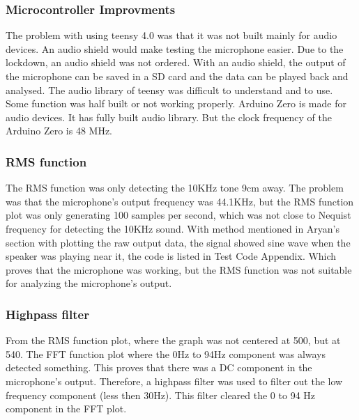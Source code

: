 \subsubsection{Microcontroller Improvments}
The problem with using teensy 4.0 was that it was not built mainly for audio devices. An audio shield would make testing the microphone easier. Due to the lockdown, an audio shield was not ordered. With an audio shield, the output of the microphone can be saved in a SD card and the data can be played back and analysed. The audio library of teensy was difficult to understand and to use. Some function was half built or not working properly. Arduino Zero is made for audio devices. It has fully built audio library. But the clock frequency of the Arduino Zero is 48 MHz.

\subsubsection{RMS function}
The RMS function was only detecting the 10KHz tone 9cm away. The problem was that the microphone's output frequency was 44.1KHz, but the RMS function plot was only generating 100 samples per second, which was not close to Nequist frequency for detecting the 10KHz sound. With method mentioned in Aryan's section with plotting the raw output data, the signal showed sine wave when the speaker was playing near it, the code is listed in Test Code Appendix. Which proves that the microphone was working, but the RMS function was not suitable for analyzing the microphone's output.  

\subsubsection{Highpass filter}
From the RMS function plot, where the graph was not centered at 500, but at 540. The FFT function plot where the 0Hz to 94Hz component was always detected something. This proves that there was a DC component in the microphone's output. Therefore, a highpass filter was used to filter out the low frequency component (less then 30Hz). This filter cleared the 0 to 94 Hz component in the FFT plot.

